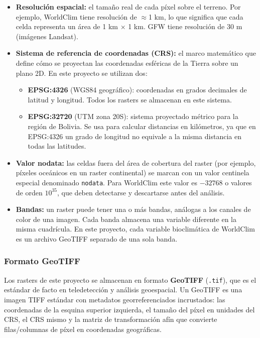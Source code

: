 \documentclass[12pt,a4paper]{article}
\begin{document}
\begin{itemize}
  \item \textbf{Resolución espacial:} el tamaño real de cada píxel sobre el terreno.
        Por ejemplo, WorldClim tiene resolución de $\approx$1 km, lo que significa que
        cada celda representa un área de 1 km $\times$ 1 km.
        GFW tiene resolución de 30 m (imágenes Landsat).

  \item \textbf{Sistema de referencia de coordenadas (CRS):} el marco matemático que
        define cómo se proyectan las coordenadas esféricas de la Tierra sobre un plano
        2D.  En este proyecto se utilizan dos:
        \begin{itemize}[nosep]
          \item \textbf{EPSG:4326} (WGS84 geográfico): coordenadas en grados decimales
                de latitud y longitud.  Todos los rasters se almacenan en este sistema.
          \item \textbf{EPSG:32720} (UTM zona 20S): sistema proyectado métrico para la
                región de Bolivia.  Se usa para calcular distancias en kilómetros, ya
                que en EPSG:4326 un grado de longitud no equivale a la misma distancia
                en todas las latitudes.
        \end{itemize}

  \item \textbf{Valor nodata:} las celdas fuera del área de cobertura del raster
        (por ejemplo, píxeles oceánicos en un raster continental) se marcan con un
        valor centinela especial denominado \texttt{nodata}.  Para WorldClim este valor
        es $-32768$ o valores de orden $10^{35}$, que deben detectarse y descartarse
        antes del análisis.

  \item \textbf{Bandas:} un raster puede tener una o más bandas, análogas a los canales
        de color de una imagen.  Cada banda almacena una variable diferente en la misma
        cuadrícula.  En este proyecto, cada variable bioclimática de WorldClim es un
        archivo GeoTIFF separado de una sola banda.
\end{itemize}

\subsubsection{Formato GeoTIFF}

Los rasters de este proyecto se almacenan en formato \textbf{GeoTIFF} (\texttt{.tif}),
que es el estándar de facto en teledetección y análisis geoespacial.
Un GeoTIFF es una imagen TIFF estándar con metadatos georreferenciados incrustados:
las coordenadas de la esquina superior izquierda, el tamaño del píxel en unidades del
CRS, el CRS mismo y la matriz de transformación afín que convierte filas/columnas de
píxel en coordenadas geográficas.
\end{document}
